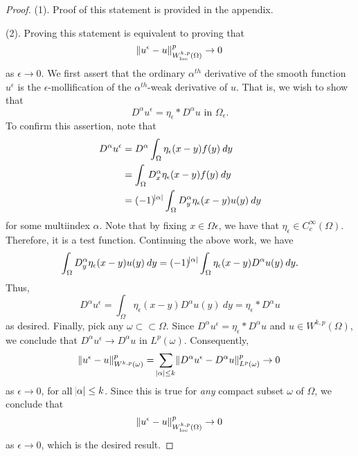 \documentclass[10pt]{article}
\begin{document}
\begin{proof}
	(1). Proof of this statement is provided in the appendix. 
	
	(2). Proving this statement is equivalent to proving that 
	\begin{equation*}
		\displaystyle \norm{u^\epsilon - u}^p_{W_{\operatorname{loc}}^{k,p}(\Omega)} \to 0
	\end{equation*}
	as $\epsilon \to 0$. We first assert that the ordinary $\alpha^{th}$ derivative of the smooth function $u^\epsilon$ is the $\epsilon$-mollification of the $\alpha^{th}$-weak derivative of $u$.  That is, we wish to show that 
	\begin{equation*}
		\displaystyle D^\alpha u^\epsilon = \eta_\epsilon * D^\alpha u \textrm{ in } \Omega_\epsilon. 
	\end{equation*}
	To confirm this assertion, note that 
	\begin{align*}
		\displaystyle D^\alpha u^\epsilon &= D^\alpha \int_{\Omega}{\eta_\epsilon(x-y)f(y) \: dy} \\
		&= \int_{\Omega}{D^\alpha_x \eta_\epsilon(x-y) f(y) \: dy} \\
		&= (-1)^{\abs{\alpha}}\int_{\Omega}{D^{\alpha}_y\eta_\epsilon(x-y)u(y) \: dy}
	\end{align*}
	for some multiindex $\alpha$. Note that by fixing $x \in \Omega\epsilon$, we have that $\eta_\epsilon \in C_c^{\infty}(\Omega)$. Therefore, it is a test function. Continuing the above work, we have 
	\begin{equation*}
		\displaystyle \int_{\Omega}{D^\alpha_y \eta_\epsilon(x-y) u(y) \: dy} = (-1)^{\abs{\alpha}}\int_{\Omega}{\eta_\epsilon(x-y)D^\alpha u(y) \: dy}. 
	\end{equation*}
	Thus, 
	\begin{equation*}
		\displaystyle D^\alpha u^\epsilon = \int_{\Omega}{\eta_\epsilon(x-y) D^\alpha u(y) \: dy} = \eta_\epsilon * D^\alpha u
	\end{equation*}
	as desired. Finally, pick any $\omega \subset \subset \Omega$. Since $D^\alpha u^\epsilon = \eta_\epsilon * D^\alpha u$ and $u \in W^{k,p}(\Omega)$, we conclude that $D^\alpha u^\epsilon \to D^\alpha u$ in $L^p(\omega)$. Consequently, 
	\begin{equation*}
		\displaystyle \norm{u^\epsilon - u}_{W^{k,p}(\omega)}^p = \sum\limits_{\abs{\alpha} \leq k}{\norm{D^\alpha u^\epsilon - D^\alpha u}_{L^p(\omega)}^p} \to 0
	\end{equation*}
	as $\epsilon \to 0$, for all $\abs{\alpha} \leq k$. Since this is true for \textit{any} compact subset $\omega$ of $\Omega$, we conclude that 
	\begin{equation*}
		\displaystyle \norm{u^\epsilon - u}_{W_{\operatorname{loc}}^{k,p}(\Omega)}^p \to 0 
	\end{equation*}
	as $\epsilon \to 0$, which is the desired result. 
\end{proof}
\end{document}
